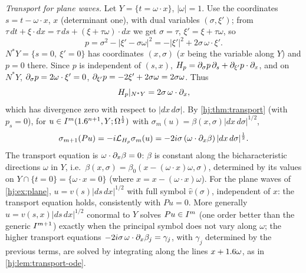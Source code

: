 \emph{Transport for plane waves.} Let $Y=\{t=\omega\cdot x\}$, $|\omega|=1$. Use the
coordinates $s=t-\omega\cdot x$, $x$ (determinant one), with dual variables $(\sigma,\xi')$;
from $\tau\,dt+\xi\cdot dx=\tau\,ds+(\xi+\tau\omega)\cdot dx$ we get $\sigma=\tau$,
$\xi'=\xi+\tau\omega$, so
\begin{equation*}
p=\sigma^2-|\xi'-\sigma\omega|^2=-|\xi'|^2+2\sigma\,\omega\cdot\xi' .
\end{equation*}
$N^*Y=\{s=0,\ \xi'=0\}$ has coordinates $(x,\sigma)$ ($x$ being the variable along $Y$) and
$p=0$ there. Since $p$ is independent of $(s,x)$,
$H_p=\partial_\sigma p\,\partial_s+\partial_{\xi'}p\cdot\partial_x$, and on $N^*Y$, $\partial_\sigma p=2\omega\cdot\xi'=0$,
$\partial_{\xi'}p=-2\xi'+2\sigma\omega=2\sigma\omega$. Thus
\begin{equation*}
H_p|_{N^*Y}=2\sigma\,\omega\cdot\partial_x,
\end{equation*}
which has divergence zero with respect to $|dx\,d\sigma|$. By \cref{hj:thm:transport} (with
$p_s=0$), for $u\in I^{m}(1.6^{n+1},Y;\Omega^{\frac12})$ with $\sigma_m(u)=\beta(x,\sigma)|dx\,d\sigma|
^{1/2}$,
\begin{equation*}
\sigma_{m+1}(Pu)=-i\mathcal L_{H_p}\sigma_m(u)=-2i\sigma\,(\omega\cdot\partial_x\beta)\,|dx\,d\sigma|
^{\frac12}.
\end{equation*}
The transport equation is $\omega\cdot\partial_x\beta=0$: $\beta$ is constant along the
bicharacteristic directions $\omega$ in $Y$, i.e.\ $\beta(x,\sigma)=\beta_0(x-(\omega\cdot x)
\omega,\sigma)$, determined by its values on $Y\cap\{t=0\}=\{\omega\cdot x=0\}$ (where
$x=x-(\omega\cdot x)\omega$). For the plane waves of \cref{hj:ex:plane},
$u=v(s)|ds\,dx|^{1/2}$ with full symbol $\hat v(\sigma)$, independent of $x$: the transport
equation holds, consistently with $Pu=0$. More generally $u=v(s,x)|ds\,dx|^{1/2}$ conormal to
$Y$ solves $Pu\in I^{m}$ (one order better than the generic $I^{m+1}$) exactly when the
principal symbol does not vary along $\omega$; the higher transport equations
$-2i\sigma\,\omega\cdot\partial_x\beta_j=\gamma_j$, with $\gamma_j$ determined by the previous
terms, are solved by integrating along the lines $x+1.6\omega$, as in
\cref{hj:lem:transport-ode}.

